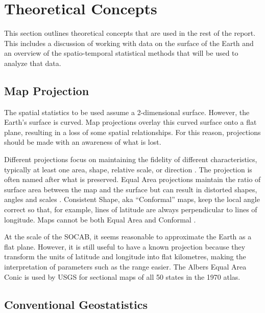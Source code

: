 \section{Theoretical Concepts}
\label{sec:theory}
This section outlines theoretical concepts that are used in the rest of the report. This includes a discussion of working with data on the surface of the Earth and an overview of the spatio-temporal statistical methods that will be used to analyze that data.

\subsection{Map Projection} \label{subsec:MapProjection}
The spatial statistics to be used assume a 2-dimensional surface. However, the Earth's surface is curved.  Map projections overlay this curved surface onto a flat plane, resulting in a loss of some spatial relationships.  For this reason, projections should be made with an awareness of what is lost.  

Different projections focus on maintaining the fidelity of different characteristics, typically at least one area, shape, relative scale, or direction \citep{USGS:MapProjections}.  The projection is often named after what is preserved.  Equal Area projections maintain the ratio of surface area between the map and the surface but can result in distorted shapes, angles and scales \citep{USGS:MapProjections}.  Consistent Shape,  aka ``Conformal'' maps, keep the local angle correct so that, for example, lines of latitude are always perpendicular to lines of longitude.  Maps cannot be both Equal Area and Conformal  \citep{USGS:MapProjections}.

At the scale of the \ac{SOCAB}, it seems reasonable to approximate the Earth as a flat plane.  However, it is still useful to have a known projection because they transform the units of latitude and longitude into flat kilometres, making the interpretation of parameters such as the range easier.  The Albers Equal Area Conic is used by \ac{USGS} for sectional maps of all 50 states in the 1970 atlas.







\subsection{Conventional Geostatistics}
\label{subsec:convgeostats}

